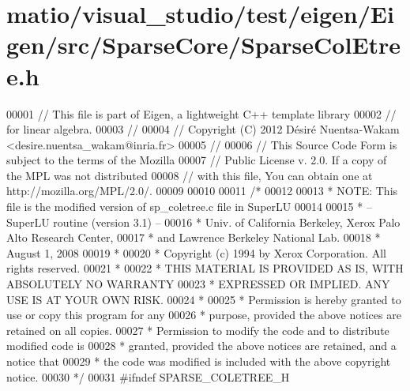 \hypertarget{matio_2visual__studio_2test_2eigen_2_eigen_2src_2_sparse_core_2_sparse_col_etree_8h_source}{}\section{matio/visual\+\_\+studio/test/eigen/\+Eigen/src/\+Sparse\+Core/\+Sparse\+Col\+Etree.h}
\label{matio_2visual__studio_2test_2eigen_2_eigen_2src_2_sparse_core_2_sparse_col_etree_8h_source}

\begin{DoxyCode}
00001 \textcolor{comment}{// This file is part of Eigen, a lightweight C++ template library}
00002 \textcolor{comment}{// for linear algebra.}
00003 \textcolor{comment}{//}
00004 \textcolor{comment}{// Copyright (C) 2012 Désiré Nuentsa-Wakam <desire.nuentsa\_wakam@inria.fr>}
00005 \textcolor{comment}{//}
00006 \textcolor{comment}{// This Source Code Form is subject to the terms of the Mozilla}
00007 \textcolor{comment}{// Public License v. 2.0. If a copy of the MPL was not distributed}
00008 \textcolor{comment}{// with this file, You can obtain one at http://mozilla.org/MPL/2.0/.}
00009 
00010 
00011 \textcolor{comment}{/* }
00012 \textcolor{comment}{ }
00013 \textcolor{comment}{ * NOTE: This file is the modified version of sp\_coletree.c file in SuperLU }
00014 \textcolor{comment}{ }
00015 \textcolor{comment}{ * -- SuperLU routine (version 3.1) --}
00016 \textcolor{comment}{ * Univ. of California Berkeley, Xerox Palo Alto Research Center,}
00017 \textcolor{comment}{ * and Lawrence Berkeley National Lab.}
00018 \textcolor{comment}{ * August 1, 2008}
00019 \textcolor{comment}{ *}
00020 \textcolor{comment}{ * Copyright (c) 1994 by Xerox Corporation.  All rights reserved.}
00021 \textcolor{comment}{ *}
00022 \textcolor{comment}{ * THIS MATERIAL IS PROVIDED AS IS, WITH ABSOLUTELY NO WARRANTY}
00023 \textcolor{comment}{ * EXPRESSED OR IMPLIED.  ANY USE IS AT YOUR OWN RISK.}
00024 \textcolor{comment}{ *}
00025 \textcolor{comment}{ * Permission is hereby granted to use or copy this program for any}
00026 \textcolor{comment}{ * purpose, provided the above notices are retained on all copies.}
00027 \textcolor{comment}{ * Permission to modify the code and to distribute modified code is}
00028 \textcolor{comment}{ * granted, provided the above notices are retained, and a notice that}
00029 \textcolor{comment}{ * the code was modified is included with the above copyright notice.}
00030 \textcolor{comment}{ */}
00031 \textcolor{preprocessor}{#ifndef SPARSE\_COLETREE\_H}

\end{DoxyCode}
